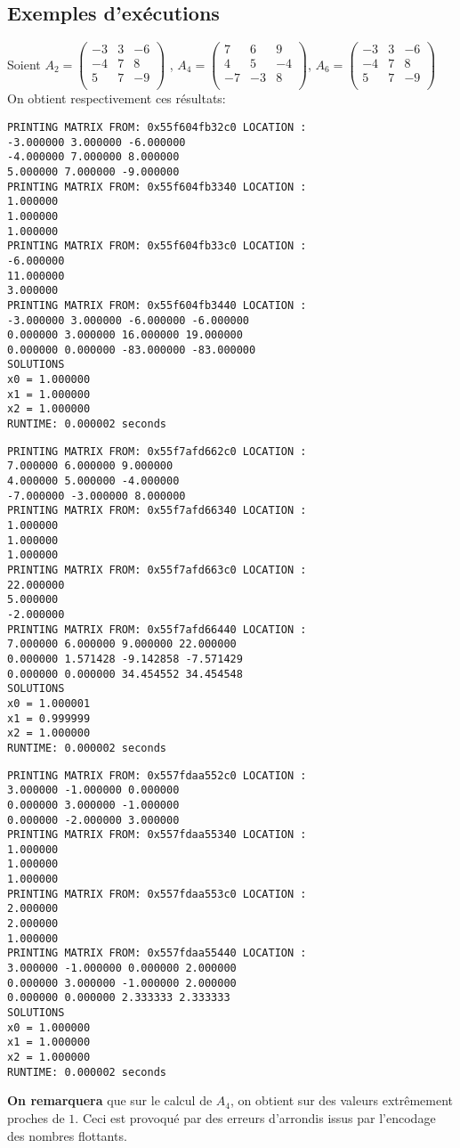 \subsection{Exemples d'exécutions}

Soient $A_2 = \begin{pmatrix}
-3 & 3 & -6 \\
-4 & 7 &  8 \\
5 & 7 & -9 \\
\end{pmatrix}
$
,
$A_4 = \begin{pmatrix}
7 & 6 & 9 \\
4 & 5 &  -4\\
-7 & -3 & 8 \\
\end{pmatrix}
$,
$A_6 = \begin{pmatrix}
-3 & 3 & -6 \\
-4 & 7 &  8 \\
5 & 7 & -9 \\
\end{pmatrix}
$
\\
On obtient respectivement ces résultats:
\\
\begin{lstlisting}[caption=Matrix 2 results]
PRINTING MATRIX FROM: 0x55f604fb32c0 LOCATION :
-3.000000 3.000000 -6.000000
-4.000000 7.000000 8.000000
5.000000 7.000000 -9.000000
PRINTING MATRIX FROM: 0x55f604fb3340 LOCATION :
1.000000
1.000000
1.000000
PRINTING MATRIX FROM: 0x55f604fb33c0 LOCATION :
-6.000000
11.000000
3.000000
PRINTING MATRIX FROM: 0x55f604fb3440 LOCATION :
-3.000000 3.000000 -6.000000 -6.000000
0.000000 3.000000 16.000000 19.000000
0.000000 0.000000 -83.000000 -83.000000
SOLUTIONS
x0 = 1.000000
x1 = 1.000000
x2 = 1.000000
RUNTIME: 0.000002 seconds   
\end{lstlisting}
\begin{lstlisting}[caption=Matrix 4 results]
PRINTING MATRIX FROM: 0x55f7afd662c0 LOCATION :
7.000000 6.000000 9.000000
4.000000 5.000000 -4.000000
-7.000000 -3.000000 8.000000
PRINTING MATRIX FROM: 0x55f7afd66340 LOCATION :
1.000000
1.000000
1.000000
PRINTING MATRIX FROM: 0x55f7afd663c0 LOCATION :
22.000000
5.000000
-2.000000
PRINTING MATRIX FROM: 0x55f7afd66440 LOCATION :
7.000000 6.000000 9.000000 22.000000
0.000000 1.571428 -9.142858 -7.571429
0.000000 0.000000 34.454552 34.454548
SOLUTIONS
x0 = 1.000001
x1 = 0.999999
x2 = 1.000000
RUNTIME: 0.000002 seconds  
\end{lstlisting}
\begin{lstlisting}[caption=Matrix 6 results]
PRINTING MATRIX FROM: 0x557fdaa552c0 LOCATION :
3.000000 -1.000000 0.000000
0.000000 3.000000 -1.000000
0.000000 -2.000000 3.000000
PRINTING MATRIX FROM: 0x557fdaa55340 LOCATION :
1.000000
1.000000
1.000000
PRINTING MATRIX FROM: 0x557fdaa553c0 LOCATION :
2.000000
2.000000
1.000000
PRINTING MATRIX FROM: 0x557fdaa55440 LOCATION :
3.000000 -1.000000 0.000000 2.000000
0.000000 3.000000 -1.000000 2.000000
0.000000 0.000000 2.333333 2.333333
SOLUTIONS
x0 = 1.000000
x1 = 1.000000
x2 = 1.000000
RUNTIME: 0.000002 seconds                       
\end{lstlisting}
\textbf{On remarquera} que sur le calcul de $A_4$, on obtient sur des valeurs extrêmement proches de $1$. Ceci est provoqué par des erreurs d'arrondis issus par l'encodage des nombres flottants.  